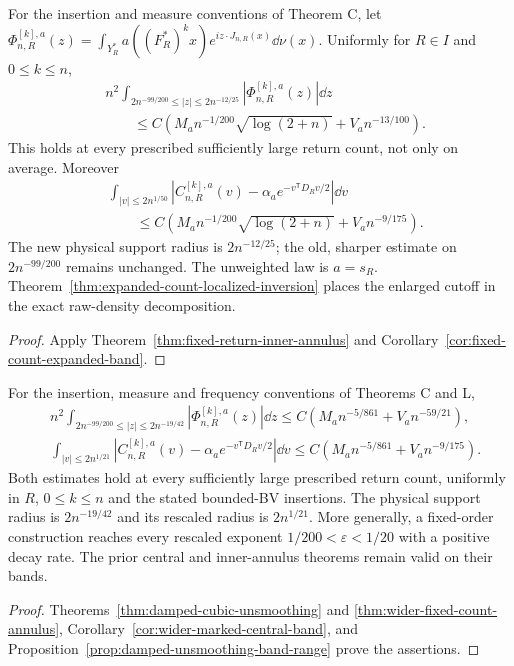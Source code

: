 \begin{maintheorem}
\label{thm:intro-fixed-return-annulus}
For the insertion and measure conventions of Theorem C, let
$\Phi^{[k],a}_{n,R}(z)=\int_{Y_R^*}a((F_R^*)^kx)e^{iz\cdot J_{n,R}(x)}\dd\nu(x)$.
Uniformly for $R\in I$ and $0\le k\le n$,
\begin{align*}
 &n^2\int_{2n^{-99/200}\le|z|\le2n^{-12/25}}
                    |\Phi^{[k],a}_{n,R}(z)|\dd z\\
 &\qquad\le C\left(M_an^{-1/200}\sqrt{\log(2+n)}+V_an^{-13/100}\right).
\end{align*}
This holds at every prescribed sufficiently large return count, not
only on average. Moreover
\begin{align*}
 &\int_{|v|\le2n^{1/50}}
 |C^{[k],a}_{n,R}(v)-\alpha_a e^{-v^{\mathsf T}D_Rv/2}|\dd v\\
 &\qquad\le C\left(M_an^{-1/200}\sqrt{\log(2+n)}+V_an^{-9/175}\right).
\end{align*}
The new physical support radius is $2n^{-12/25}$; the old,
sharper estimate on $2n^{-99/200}$ remains unchanged. The unweighted
law is $a=s_R$. Theorem~\ref{thm:expanded-count-localized-inversion}
places the enlarged cutoff in the exact raw-density decomposition.
\end{maintheorem}
\begin{proof}
Apply Theorem~\ref{thm:fixed-return-inner-annulus} and
Corollary~\ref{cor:fixed-count-expanded-band}.
\end{proof}

\begin{maintheorem}
\label{thm:intro-damped-unsmoothing}
For the insertion, measure and frequency conventions of Theorems C and L,
\begin{align*}
 &n^2\int_{2n^{-99/200}\le|z|\le2n^{-19/42}}
          |\Phi^{[k],a}_{n,R}(z)|\dd z
        \le C\left(M_an^{-5/861}+V_an^{-59/21}\right),\\
 &\int_{|v|\le2n^{1/21}}
   \left|C^{[k],a}_{n,R}(v)-\alpha_a e^{-v^{\mathsf T}D_Rv/2}\right|\dd v
        \le C\left(M_an^{-5/861}+V_an^{-9/175}\right).
\end{align*}
Both estimates hold at every sufficiently large prescribed return count,
uniformly in $R$, $0\le k\le n$ and the stated bounded-BV insertions.
The physical support radius is $2n^{-19/42}$ and its rescaled radius is
$2n^{1/21}$. More generally, a fixed-order construction reaches every
rescaled exponent $1/200<\varepsilon<1/20$ with a positive decay rate.
The prior central and inner-annulus theorems remain valid on their bands.
\end{maintheorem}
\begin{proof}
Theorems~\ref{thm:damped-cubic-unsmoothing} and
\ref{thm:wider-fixed-count-annulus},
Corollary~\ref{cor:wider-marked-central-band}, and
Proposition~\ref{prop:damped-unsmoothing-band-range} prove the assertions.
\end{proof}

